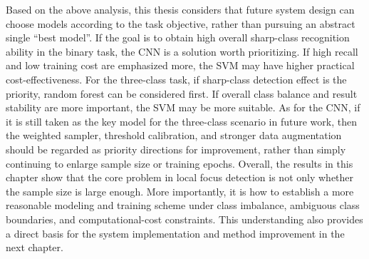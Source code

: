\par Based on the above analysis, this thesis considers that future system
design can choose models according to the task objective, rather than pursuing
an abstract single ``best model''. If the goal is to obtain high overall
sharp-class recognition ability in the binary task, the CNN is a solution worth
prioritizing. If high recall and low training cost are emphasized more, the
SVM may have higher practical cost-effectiveness. For the three-class task, if
sharp-class detection effect is the priority, random forest can be considered
first. If overall class balance and result stability are more important, the
SVM may be more suitable. As for the CNN, if it is still taken as the key
model for the three-class scenario in future work, then the weighted sampler,
threshold calibration, and stronger data augmentation should be regarded as
priority directions for improvement, rather than simply continuing to enlarge
sample size or training epochs. Overall, the results in this chapter show that
the core problem in local focus detection is not only whether the sample size
is large enough. More importantly, it is how to establish a more reasonable
modeling and training scheme under class imbalance, ambiguous class boundaries,
and computational-cost constraints. This understanding also provides a direct
basis for the system implementation and method improvement in the next chapter.
